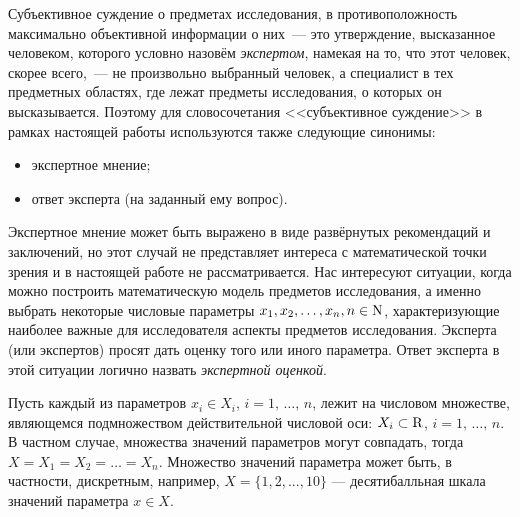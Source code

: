Субъективное суждение о предметах исследования, в противоположность максимально объективной информации о них~--- это утверждение, высказанное человеком, которого  условно назовём {\sl экспертом}, намекая на то, что этот человек, скорее всего,~--- не произвольно выбранный человек, а специалист в тех предметных областях, где лежат предметы исследования, о которых он высказывается. Поэтому для словосочетания <<субъективное суждение>> в рамках настоящей работы используются также следующие синонимы: 
\begin{itemize}
	\item экспертное мнение;
	\item ответ эксперта (на заданный ему вопрос). 
 \end{itemize}
 
Экспертное мнение может быть выражено в виде развёрнутых рекомендаций и заключений, но этот случай не представляет интереса с математической точки зрения и в настоящей работе не рассматривается.  Нас интересуют ситуации, когда можно построить математическую модель предметов исследования, а именно выбрать некоторые числовые параметры $x_1, x_2, \ldots, x_n, n \in {\mathrm{N}}$, характеризующие наиболее важные для исследователя аспекты предметов исследования. Эксперта (или экспертов) просят дать  оценку того или иного параметра. Ответ эксперта в этой ситуации логично назвать {\sl экспертной оценкой}. 

Пусть каждый из параметров $x_i \in X_i$,  $i=1,\, \ldots,\, n$, лежит на числовом множестве, являющемся подмножеством действительной числовой оси: $X_i \subset {\mathrm{R}}$, $i=1,\, \ldots,\, n$. В частном случае, множества значений параметров могут совпадать, тогда $X = X_1 = X_2 = \ldots = X_n$. Множество значений параметра может быть, в частности, дискретным, например, $X = \{1, 2, ..., 10\}$ --- десятибалльная шкала значений параметра $x \in X$.

